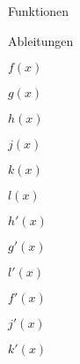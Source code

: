 \begin{Answer}[ref=schaubildZuordnenA1]

	\begin{minipage}{\textwidth}
		\begin{minipage}{0.5\textwidth}
			\centering Funktionen
		\end{minipage}%
		\begin{minipage}{0.5\textwidth}
			\centering Ableitungen
		\end{minipage}%

		\begin{minipage}{0.25\textwidth}
			\centering\(f(x)\)\vspace{0.2cm}

			\centering\(g(x)\)\vspace{0.2cm}

			\centering\(h(x)\)
		\end{minipage}%
		\begin{minipage}{0.25\textwidth}
			\centering\(j(x)\)\vspace{0.2cm}

			\centering\(k(x)\)\vspace{0.2cm}

			\centering\(l(x)\)
		\end{minipage}%
		\begin{minipage}{0.25\textwidth}
			\centering\(h'(x)\)\vspace{0.2cm}

			\centering\(g'(x)\)\vspace{0.2cm}

			\centering\(l'(x)\)
		\end{minipage}%
		\begin{minipage}{0.25\textwidth}
			\centering\(f'(x)\)\vspace{0.2cm}

			\centering\(j'(x)\)\vspace{0.2cm}

			\centering\(k'(x)\)
		\end{minipage}%
	\end{minipage}%
\end{Answer}
